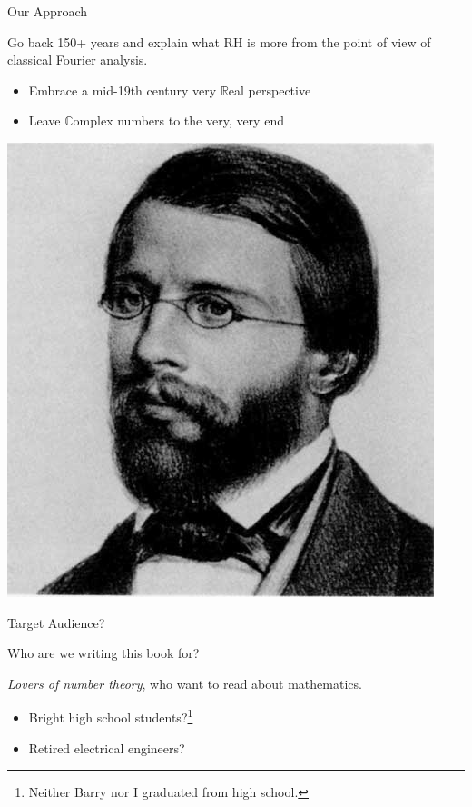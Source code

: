 \documentclass{beamer}
\begin{document}
\begin{frame}{Our Approach}
  \begin{block}{}
    Go back 150+ years and explain what RH is more from the point of view of  classical Fourier analysis.
    \begin{itemize}
      \item Embrace a mid-19th century very $\mathbb{R}$eal perspective
      \item Leave $\mathbb{C}$omplex numbers to the very, very end
    \end{itemize}
  \end{block}
  \begin{center}
    \includegraphics[height=.5\textheight]{pics/riemann}
  \end{center}

\end{frame}


\begin{frame}{Target Audience?}

  \begin{block}{Who are we writing this book for?}
    \vspace{.25in}

    {\em Lovers of number theory}, who want to read about mathematics.
    \vspace{.25in}

    \begin{itemize}
      \item Bright high school students?\footnote{Neither Barry nor I  graduated from high school.}
      \item Retired electrical engineers?
    \end{itemize}
    \vspace{.5in}

  \end{block}

\end{frame}
\end{document}
